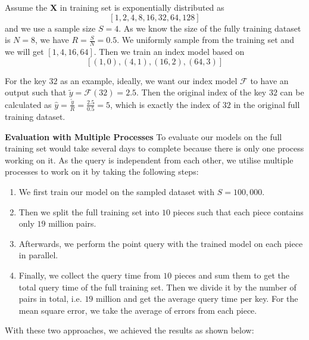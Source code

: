 \begin{mscexample}
	\label{mscexample:sampled_training}
	Assume the \textbf{X} in training set is exponentially distributed as $$[1,2,4,8,16,32,64,128]$$ and we use a sample size $S=4$. As we know the size of the fully training dataset is $N=8$, we have $R=\frac{S}{N}=0.5$. We uniformly sample from the training set and we will get $[1,4,16,64]$. Then we train an index model based on $$[(1,0), (4,1), (16,2), (64,3)]$$ 
	
	For the key $32$ as an example, ideally, we want our index model $\mathcal{F}$ to have an output such that $\tilde{y}=\mathcal{F}(32)=2.5$. Then the original index of the key $32$ can be calculated as $\hat{y}=\frac{\tilde{y}}{R}=\frac{2.5}{0.5}=5$, which is exactly the index of $32$ in the original full training dataset.
\end{mscexample}


\textbf{Evaluation with Multiple Processes} To evaluate our models on the full training set would take several days to complete because there is only one process working on it. As the query is independent from each other, we utilise multiple processes to work on it by taking the following steps:

\begin{enumerate}
	\item We first train our model on the sampled dataset with $S=100,000$.
	\item Then we split the full training set into $10$ pieces such that each piece contains only $19$ million pairs.
	\item Afterwards, we perform the point query with the trained model on each piece in parallel.
	\item Finally, we collect the query time from $10$ pieces and sum them to get the total query time of the full training set. Then we divide it by the number of pairs in total, i.e. $19$ million and get the average query time per key. For the mean square error, we take the average of errors from each piece.
\end{enumerate}

With these two approaches, we achieved the results as shown below:

